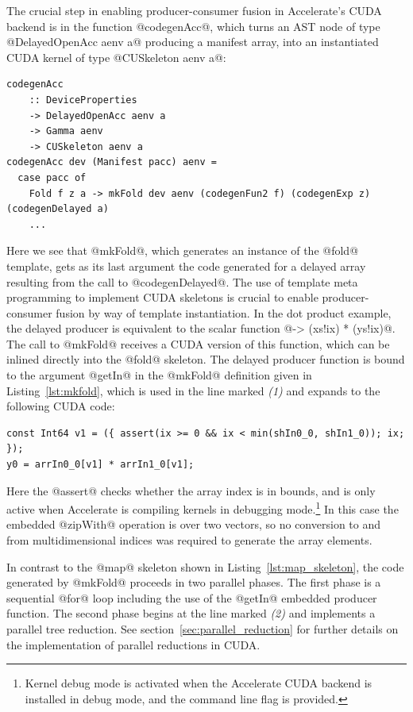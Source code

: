 The crucial step in enabling producer-consumer fusion in Accelerate's CUDA
backend is in the function @codegenAcc@, which turns an AST node of type
@DelayedOpenAcc aenv a@ producing a manifest array, into an instantiated CUDA
kernel of type @CUSkeleton aenv a@:
%
\begin{lstlisting}[style=haskell]
codegenAcc
    :: DeviceProperties
    -> DelayedOpenAcc aenv a
    -> Gamma aenv
    -> CUSkeleton aenv a
codegenAcc dev (Manifest pacc) aenv =
  case pacc of
    Fold f z a -> mkFold dev aenv (codegenFun2 f) (codegenExp z) (codegenDelayed a)
    ...
\end{lstlisting}
%
Here we see that @mkFold@, which generates an instance of the @fold@
template, gets as its last argument the code generated for a delayed array
resulting from the call to @codegenDelayed@. The use of template meta
programming to implement CUDA skeletons is crucial to enable producer-consumer
fusion by way of template instantiation. In the dot product example, the delayed
producer is equivalent to the scalar function @\ix -> (xs!ix) * (ys!ix)@.
The call to @mkFold@ receives a CUDA version of this function, which can be
inlined directly into the @fold@ skeleton. The delayed producer function is
bound to the argument @getIn@ in the @mkFold@ definition given in
Listing~\ref{lst:mkfold}, which is used in the line marked \emph{(1)} and
expands to the following CUDA code:
%
\begin{lstlisting}[style=haskell]
const Int64 v1 = ({ assert(ix >= 0 && ix < min(shIn0_0, shIn1_0)); ix; });
y0 = arrIn0_0[v1] * arrIn1_0[v1];
\end{lstlisting}
%
Here the @assert@ checks whether the array index is in bounds, and is only
active when Accelerate is compiling kernels in debugging mode.\footnote{Kernel
debug mode is activated when the Accelerate CUDA backend is installed in debug
mode, and the command line flag  is provided.} In this case the
embedded @zipWith@ operation is over two vectors, so no conversion to and
from multidimensional indices was required to generate the array elements.

In contrast to the @map@ skeleton shown in Listing~\ref{lst:map_skeleton}, the
code generated by @mkFold@ proceeds in two parallel phases. The first phase is a
sequential @for@ loop including the use of the @getIn@ embedded producer
function. The second phase begins at the line marked \emph{(2)} and implements a
parallel tree reduction. See section~\ref{sec:parallel_reduction} for further
details on the implementation of parallel reductions in CUDA.

